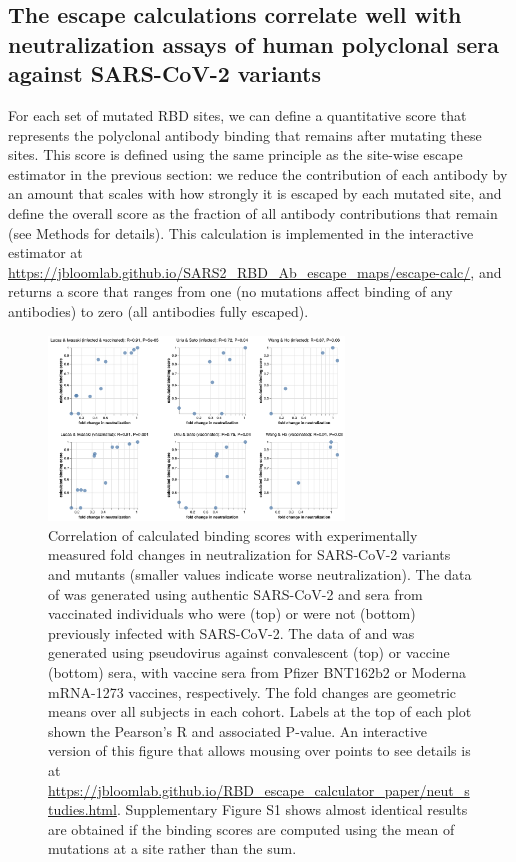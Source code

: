 \documentclass[9pt,twocolumn,twoside]{gsajnl_modified}
\begin{document}
\subsection{The escape calculations correlate well with neutralization assays of human polyclonal sera against SARS-CoV-2 variants}
For each set of mutated RBD sites, we can define a quantitative score that represents the polyclonal antibody binding that remains after mutating these sites.
This score is defined using the same principle as the site-wise escape estimator in the previous section: we reduce the contribution of each antibody by an amount that scales with how strongly it is escaped by each mutated site, and define the overall score as the fraction of all antibody contributions that remain (see Methods for details).
This calculation is implemented in the interactive estimator at \url{https://jbloomlab.github.io/SARS2_RBD_Ab_escape_maps/escape-calc/}, and returns a score that ranges from one (no mutations affect binding of any antibodies) to zero (all antibodies fully escaped).

\begin{figure}
\includegraphics[width=0.7\textwidth]{../results/neut_studies/neut_studies.png}
\caption{Correlation of calculated binding scores with experimentally measured fold changes in neutralization for SARS-CoV-2 variants and mutants (smaller values indicate worse neutralization).
The data of \citet{lucas2021impact} was generated using authentic SARS-CoV-2 and sera from vaccinated individuals who were (top) or were not (bottom) previously infected with SARS-CoV-2.
The data of \citet{uriu2021neutralization} and \citet{wang2021antibody} was generated using pseudovirus against convalescent (top) or vaccine (bottom) sera, with vaccine sera from Pfizer BNT162b2 or Moderna mRNA-1273 vaccines, respectively. 
The fold changes are geometric means over all subjects in each cohort.
Labels at the top of each plot shown the Pearson's R and associated P-value.
An interactive version of this figure that allows mousing over points to see details is at \url{https://jbloomlab.github.io/RBD_escape_calculator_paper/neut_studies.html}.
Supplementary Figure S1 shows almost identical results are obtained if the binding scores are computed using the mean of mutations at a site rather than the sum.
}
\label{fig:neut_studies}
\end{figure}
\end{document}
